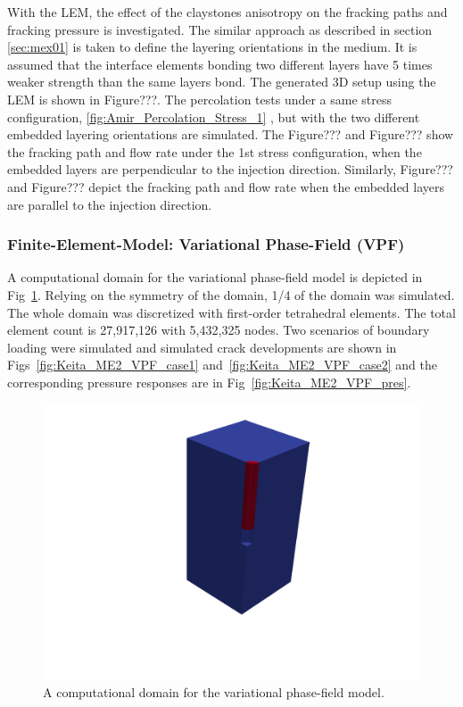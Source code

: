 With the LEM, the effect of the claystones anisotropy on the fracking paths and fracking pressure is investigated. The similar approach as described in section \ref {sec:mex01} is taken to define the layering orientations in the medium. It is assumed that the interface elements bonding two different layers have 5 times weaker strength than the same layers bond. The generated 3D setup using the LEM is shown in Figure???. The percolation tests under a same stress configuration, \ref{fig:Amir_Percolation_Stress_1} , but with the two different embedded layering orientations are simulated. The Figure??? and Figure??? show the fracking path and flow rate under the 1st stress configuration, when the embedded layers are perpendicular to the injection direction. Similarly, Figure??? and Figure??? depict the fracking path and flow rate when the embedded layers are parallel to the injection direction.


\subsubsection*{Finite-Element-Model: Variational Phase-Field (VPF)}

A computational domain for the variational phase-field model is depicted in Fig~\ref{fig:VPF_init}.
Relying on the symmetry of the domain, 1/4 of the domain was simulated. 
The whole domain was discretized with first-order tetrahedral elements.
The total element count is 27,917,126 with 5,432,325 nodes.
Two scenarios of boundary loading were simulated and simulated crack developments are shown in Figs~\ref{fig:Keita_ME2_VPF_case1} and~\ref{fig:Keita_ME2_VPF_case2} and the corresponding pressure responses are in Fig~\ref{fig:Keita_ME2_VPF_pres}.

\begin{figure}[!ht]
\centering
\includegraphics[width=1.0\textwidth]{figures/VPF_init.png}
\caption{A computational domain for the variational phase-field model.}
\label{fig:VPF_init}
\end{figure}

